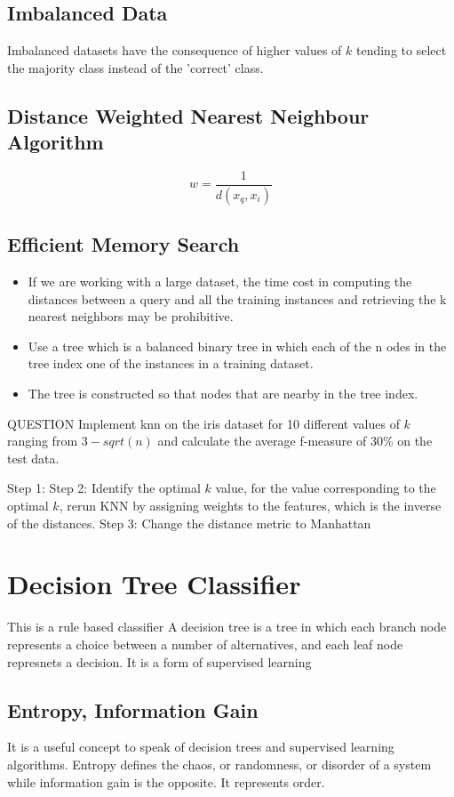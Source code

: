 \documentclass[11pt]{article}
\begin{document}
\subsection{Imbalanced Data}
\label{sec:org83f61e6}
Imbalanced datasets have the consequence of higher values of \(k\) tending to select the majority class instead of the 'correct' class.
\subsection{Distance Weighted Nearest Neighbour Algorithm}
\label{sec:orga8400f3}
$$w = \frac{1}{d(x_{q},x_{i})}$$
\subsection{Efficient Memory Search}
\label{sec:org8b6299f}
\begin{itemize}
\item If we are working with a large dataset, the time cost in computing the distances between a query and all the training instances and retrieving the k nearest neighbors may be prohibitive.
\item Use a tree which is a balanced binary tree in which each of the n odes in the tree index one of the instances in a training dataset.
\item The tree is constructed so that nodes that are nearby in the tree index.
\end{itemize}


QUESTION Implement knn on the iris dataset for 10 different values of \(k\) ranging from \(3 - sqrt(n)\) and calculate the average f-measure of 30\% on the test data.

Step 1:
Step 2: Identify the optimal \(k\) value, for the value corresponding to the optimal \(k\), rerun KNN by assigning weights to the features, which is the inverse of the distances.
Step 3: Change the distance metric to Manhattan
\section{Decision Tree Classifier}
\label{sec:orge0e477f}
This is a rule based classifier
A decision tree is a tree in which each branch node represents a choice between a number of alternatives, and each leaf node represnets a decision. It is a form of supervised learning
\subsection{Entropy, Information Gain}
\label{sec:org92f61bf}
It is a useful concept to speak of decision trees and supervised learning algorithms. Entropy defines the chaos, or randomness, or disorder of a system while information gain is the opposite. It represents order.
\end{document}
